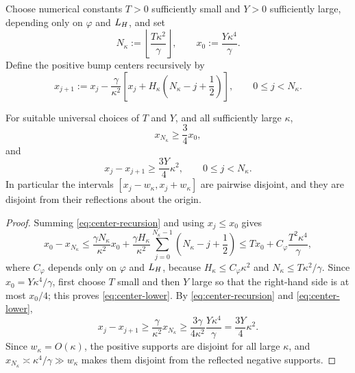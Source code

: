 Choose numerical constants $T>0$ sufficiently small and $Y>0$ sufficiently large, depending
only on $\varphi$ and $L_H$, and set
\begin{equation}\label{eq:bump-count-x0}
    N_\kappa:=\left\lfloor\frac{T\kappa^2}\gamma\right\rfloor,
    \qquad
    x_0:=\frac{Y\kappa^4}\gamma .
\end{equation}
Define the positive bump centers recursively by
\begin{equation}\label{eq:center-recursion}
    x_{j+1}:=x_j-\frac\gamma{\kappa^2}
    \left[x_j+H_\kappa\left(N_\kappa-j+\frac12\right)\right],
    \qquad
    0\leq j<N_\kappa .
\end{equation}

\begin{lemma}\label{lem:bump-centers}
    For suitable universal choices of $T$ and $Y$, and all sufficiently large $\kappa$,
    \begin{equation}\label{eq:center-lower}
        x_{N_\kappa}\geq\frac34x_0,
    \end{equation}
    and
    \begin{equation}\label{eq:center-spacing}
        x_j-x_{j+1}\geq\frac{3Y}4\kappa^2,
        \qquad
        0\leq j<N_\kappa .
    \end{equation}
    In particular the intervals $[x_j-w_\kappa,x_j+w_\kappa]$ are pairwise disjoint, and they
    are disjoint from their reflections about the origin.
\end{lemma}

\begin{proof}
    Summing \eqref{eq:center-recursion} and using $x_j\leq x_0$ gives
    \begin{equation*}
        x_0-x_{N_\kappa}
        \leq
        \frac{\gamma N_\kappa}{\kappa^2}x_0
        +\frac{\gamma H_\kappa}{\kappa^2}\sum_{j=0}^{N_\kappa-1}\left(N_\kappa-j+\frac12\right)
        \leq
        Tx_0+C_\varphi\frac{T^2\kappa^4}\gamma,
    \end{equation*}
    where $C_\varphi$ depends only on $\varphi$ and $L_H$, because
    $H_\kappa\leq C_\varphi\kappa^2$ and $N_\kappa\leq T\kappa^2/\gamma$. Since
    $x_0=Y\kappa^4/\gamma$, first choose $T$ small and then $Y$ large so that the right-hand
    side is at most $x_0/4$; this proves \eqref{eq:center-lower}. By
    \eqref{eq:center-recursion} and \eqref{eq:center-lower},
    \begin{equation*}
        x_j-x_{j+1}
        \geq\frac\gamma{\kappa^2}x_{N_\kappa}
        \geq\frac{3\gamma}{4\kappa^2}\frac{Y\kappa^4}\gamma
        =\frac{3Y}4\kappa^2 .
    \end{equation*}
    Since $w_\kappa=O(\kappa)$, the positive supports are disjoint for all large $\kappa$, and
    $x_{N_\kappa}\asymp\kappa^4/\gamma\gg w_\kappa$ makes them disjoint from the reflected
    negative supports.
\end{proof}

